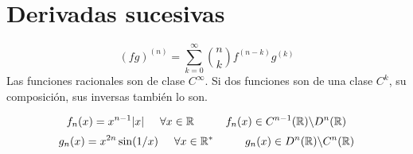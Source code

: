 \section{Derivadas sucesivas}
$$ (fg)^{(n)}= \sum_{k=0}^{\infty} \binom{n}{k} f^{(n-k)}g^{(k)} $$
Las funciones racionales son de clase $C^{\infty}$. Si dos funciones son de una clase $C^k$, su composición, sus inversas también lo son.

$$f_n(x) = x^{n-1}|x| \hspace{0.5cm}\forall x\in\mathbb{R} \hspace{1cm} f_n(x)\in C^{n-1}(\mathbb{R})\backslash D^n(\mathbb{R})$$
$$ g_n(x) = x^{2n}\sin (1/x) \hspace{0.5cm}\forall x\in\mathbb{R}^*\hspace{1cm} g_n(x)\in D^n(\mathbb{R})\backslash C^n(\mathbb{R})$$
